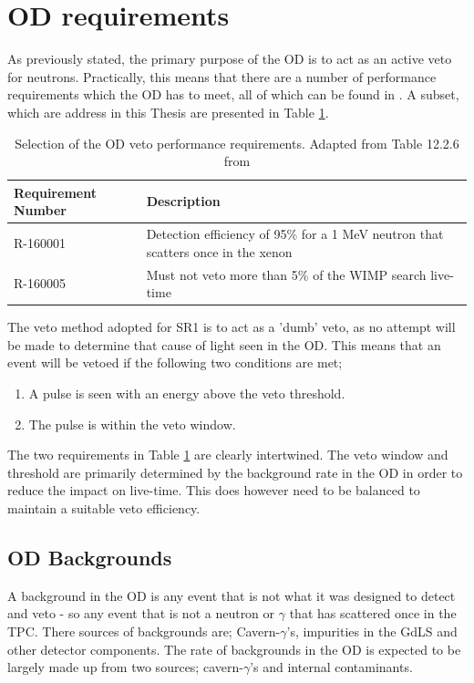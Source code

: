 \section{OD requirements}

\par
As previously stated, the primary purpose of the OD is to act as an active veto for neutrons.
Practically, this means that there are a number of performance requirements which the OD has to meet, all of which can be found in \cite{LZ_TechnicalDesignReview_ref}.
A subset, which are address in this Thesis are presented in Table \ref{tab:veto_requirements}.

\begin{table}[!htbp]
    \centering
    \begin{tabular}{p{}p{}} %
    \hline
    {Requirement Number} & {Description} \\ \hline
    R-160001             & Detection efficiency of 95\% for a 1 MeV neutron that scatters once in the xenon \\
    R-160005             & Must not veto more than 5\% of the WIMP search live-time
    \end{tabular}
    \caption{Selection of the OD veto performance requirements. Adapted from Table 12.2.6 from \cite{LZ_TechnicalDesignReview_ref}}
    \label{tab:veto_requirements}
\end{table} 

\par
The veto method adopted for SR1 is to act as a 'dumb' veto, as no attempt will be made to determine that cause of light seen in the OD.
This means that an event will be vetoed if the following two conditions are met;

\begin{enumerate}
    \item A pulse is seen with an energy above the veto threshold.
    \item The pulse is within the veto window.
\end{enumerate}

The two requirements in Table \ref{tab:veto_requirements} are clearly intertwined.
The veto window and threshold are primarily determined by the background rate in the OD in order to reduce the impact on live-time.
This does however need to be balanced to maintain a suitable veto efficiency.

\subsection{OD Backgrounds}
\par
A background in the OD is any event that is not what it was designed to detect and veto - so any event that is not a neutron or $\gamma$ that has scattered once in the TPC.
There sources of backgrounds are; Cavern-$\gamma$'s, impurities in the GdLS and other detector components.
The rate of backgrounds in the OD is expected to be largely made up from two sources; cavern-$\gamma$'s and internal contaminants. 

